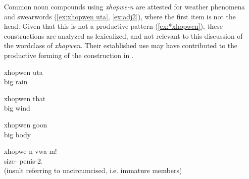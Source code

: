 Common noun compounds using \textit{xhopwe-n} are attested for weather phenomena and swearwords (\ref{ex:xhopwen uta}, \ref{ex:adj2}), where the first item is not the head. Given that this is not a productive pattern (\ref{ex:*xhopwen}), these constructions are analyzed as lexicalized, and not relevant to this discussion of the wordclass of \textit{xhopwen}. Their established use may have contributed to the productive forming of the construction in .


	\ea \label{ex:xhopwen uta}
	\gll 	xhopwen uta	\\
		big rain	\\
	\glt	{}	
\z
	
	\ea
	\gll 	xhopwen that	\\
		big wind	\\
	\glt	{}	
	\z 

	\ea\label{ex:*xhopwen}
	\gll 	*xhopwen goon	\\
		big body	\\
	\z 
	
	\ea
	\label{ex:adj2}
	\gll xhopwe-n vwa-m!\\
	 size- penis-2.\\
	\glt {} (insult referring to uncircumcised, i.e. immature members)
		\z

